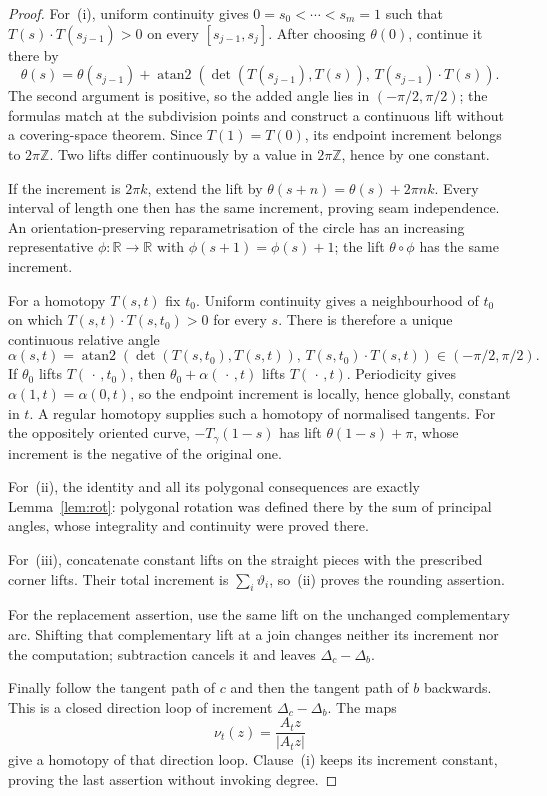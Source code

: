 \begin{proof}\leanok{}
For~(i), uniform continuity gives
$0=s_0<\cdots<s_m=1$ such that
$T(s)\cdot T(s_{j-1})>0$ on every
$[s_{j-1},s_j]$. After choosing $\theta(0)$, continue it there by
\[
 \theta(s)=\theta(s_{j-1})+
 \operatorname{atan2}\!\left(
   \det(T(s_{j-1}),T(s)),\,
   T(s_{j-1})\cdot T(s)\right).
\]
The second argument is positive, so the added angle lies in
$(-\pi/2,\pi/2)$; the formulas match at the subdivision points and construct a
continuous lift without a covering-space theorem. Since $T(1)=T(0)$, its
endpoint increment belongs to $2\pi\mathbb Z$. Two lifts differ continuously
by a value in $2\pi\mathbb Z$, hence by one constant.

If the increment is $2\pi k$, extend the lift by
$\theta(s+n)=\theta(s)+2\pi nk$. Every interval of length one then has the same
increment, proving seam independence. An orientation-preserving
reparametrisation of the circle has an increasing representative
$\phi\colon\mathbb R\to\mathbb R$ with
$\phi(s+1)=\phi(s)+1$; the lift $\theta\circ\phi$ has the same increment.

For a homotopy $T(s,t)$ fix $t_0$. Uniform continuity gives a neighbourhood of
$t_0$ on which
$T(s,t)\cdot T(s,t_0)>0$ for every $s$. There is therefore
a unique continuous relative angle
\[
 \alpha(s,t)=\operatorname{atan2}\!\left(
 \det(T(s,t_0),T(s,t)),\,
 T(s,t_0)\cdot T(s,t)\right)
 \in(-\pi/2,\pi/2).
\]
If $\theta_0$ lifts $T(\,\cdot\,,t_0)$, then
$\theta_0+\alpha(\,\cdot\,,t)$ lifts $T(\,\cdot\,,t)$.
Periodicity gives $\alpha(1,t)=\alpha(0,t)$, so the endpoint increment is
locally, hence globally, constant in $t$. A regular homotopy supplies such a
homotopy of normalised tangents. For the oppositely oriented curve,
$-T_\gamma(1-s)$ has lift $\theta(1-s)+\pi$, whose increment is the negative
of the original one.

For~(ii), the identity and all its polygonal consequences are exactly
Lemma~\ref{lem:rot}: polygonal rotation was defined there by the sum of
principal angles, whose integrality and continuity were proved there.

For~(iii), concatenate constant lifts on the straight pieces with the
prescribed corner lifts. Their total increment is $\sum_i\vartheta_i$, so~(ii)
proves the rounding assertion.

For the replacement assertion, use the same lift on the unchanged
complementary arc. Shifting that complementary lift at a join changes neither
its increment nor the computation; subtraction cancels it and leaves
$\Delta_c-\Delta_b$.

Finally follow the tangent path of $c$ and then the tangent path of $b$
backwards. This is a closed direction loop of increment
$\Delta_c-\Delta_b$. The maps
\[
   \nu_t(z)=\frac{A_tz}{|A_tz|}
\]
give a homotopy of that direction loop. Clause~(i) keeps its increment
constant, proving the last assertion without invoking degree.
\end{proof}

